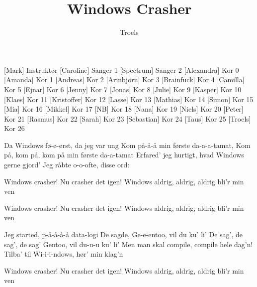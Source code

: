 \documentclass[a4paper,11pt]{article}
\title{Windows Crasher}
\author{Troels}
\begin{document}
\maketitle

\begin{roles}
[Mark] Instruktør
[Caroline] Sanger 1
[Spectrum] Sanger 2
[Alexandra] Kor 0
[Amanda] Kor 1
[Andreas] Kor 2
[Arinbjörn] Kor 3
[Brainfuck] Kor 4
[Camilla] Kor 5
[Ejnar] Kor 6
[Jenny] Kor 7
[Jonas] Kor 8
[Julie] Kor 9
[Kasper] Kor 10
[Klaes] Kor 11
[Kristoffer] Kor 12
[Lasse] Kor 13
[Mathias] Kor 14
[Simon] Kor 15
[Mia] Kor 16
[Mikkel] Kor 17
[NB] Kor 18
[Nana] Kor 19
[Niels] Kor 20
[Peter] Kor 21
[Rasmus] Kor 22
[Sarah] Kor 23
[Sebastian] Kor 24
[Taus] Kor 25
[Troels] Kor 26
\end{roles}

\begin{song}
 Da Windows fø-ø-ørst, da jeg var ung
Kom på-å-å min første da-a-a-tamat,
Kom på, kom på, kom på min første da-a-tamat
Erfared' jeg hurtigt, hvad Windows gerne gjord'
Jeg råbte o-o-ofte, disse ord:

 Windows crasher!
Nu crasher det igen!
Windows aldrig, aldrig, aldrig bli'r min ven

 Windows crasher!
Nu crasher det igen!
Windows aldrig, aldrig, aldrig bli'r min ven

 Jeg started, p-å-å-å-å data-logi
De sagde, Ge-e-entoo, vil du ku' li'
De sag', de sag', de sag' Gentoo, vil du-u-u ku' li'
Men man skal compile, compile hele dag'n!
Tilba' til Wi-i-i-ndows, hør' min klag'n

 Windows crasher!
Nu crasher det igen!
Windows aldrig, aldrig, aldrig bli'r min ven
\end{song}
\end{document}
